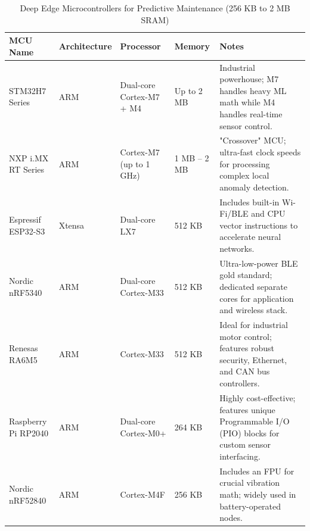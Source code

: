 \documentclass[sn-basic]{sn-jnl} %
\begin{document}
\begin{table}[htbp]
    \centering
    \caption{Deep Edge Microcontrollers for Predictive Maintenance (256 KB to 2 MB SRAM)}
    \label{tab:deep_edge_mcus}
    \renewcommand{\arraystretch}{1.3} %
    \begin{tabular}{@{} l l l l p{5.5cm} @{}}
        \toprule
        \textbf{MCU Name} & \textbf{Architecture} & \textbf{Processor} & \textbf{Memory} & \textbf{Notes} \\
        \midrule
        STM32H7 Series & ARM & Dual-core Cortex-M7 + M4 & Up to 2 MB & Industrial powerhouse; M7 handles heavy ML math while M4 handles real-time sensor control. \\
        
        NXP i.MX RT Series & ARM & Cortex-M7 (up to 1 GHz) & 1 MB -- 2 MB & "Crossover" MCU; ultra-fast clock speeds for processing complex local anomaly detection. \\
        
        Espressif ESP32-S3 & Xtensa & Dual-core LX7 & 512 KB & Includes built-in Wi-Fi/BLE and CPU vector instructions to accelerate neural networks. \\
        
        Nordic nRF5340 & ARM & Dual-core Cortex-M33 & 512 KB & Ultra-low-power BLE gold standard; dedicated separate cores for application and wireless stack. \\
        
        Renesas RA6M5 & ARM & Cortex-M33 & 512 KB & Ideal for industrial motor control; features robust security, Ethernet, and CAN bus controllers. \\
        
        Raspberry Pi RP2040 & ARM & Dual-core Cortex-M0+ & 264 KB & Highly cost-effective; features unique Programmable I/O (PIO) blocks for custom sensor interfacing. \\
        
        Nordic nRF52840 & ARM & Cortex-M4F & 256 KB & Includes an FPU for crucial vibration math; widely used in battery-operated nodes. \\
        \bottomrule
    \end{tabular}
\end{table}
\end{document}
